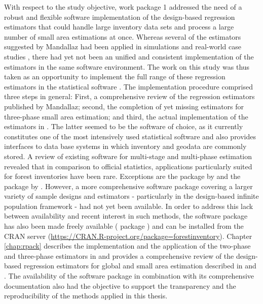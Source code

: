 With respect to the study objective, work package 1 addressed the need of a robust and flexible software implementation of the design-based regression estimators that could handle large inventory data sets and process a large number of small area estimations at once. Whereas several of the estimators suggested by Mandallaz had been applied in simulations and real-world case studies \citep{mandallaz2013a, mandallaz2013b, mandallaz2013c, massey2014a, massey2015a, massey2015b}, there had yet not been an unified and consistent implementation of the estimators in the same software environment. The work on this study was thus taken as an opportunity to implement the full range of these regression estimators in the statistical software  \citep{R}. The implementation procedure comprised three steps in general: First, a comprehensive review of the regression estimators published by Mandallaz; second, the completion of yet missing estimators for three-phase small area estimation; and third, the actual implementation of the estimators in . The latter seemed to be the software of choice, as it currently constitutes one of the most intensively used statistical software and also provides interfaces to data base systems in which inventory and geodata are commonly stored. A review of existing software for multi-stage and multi-phase estimation revealed that in comparison to official statistics, applications particularly suited for forest inventories have been rare. Exceptions are the  package  by \citet{josae2015} and the  package by \citet{cullmann2016}. However, a more comprehensive software package covering a larger variety of sample designs and estimators - particularly in the design-based infinite population framework - had not yet been available. In order to address this lack between availability and recent interest in such methods, the software package has also been made freely available ( package ) and can be installed from the CRAN server (\url{https://CRAN.R-project.org/package=forestinventory}). Chapter \ref{chap:rpack} describes the implementation and the application of the two-phase and three-phase estimators in  and provides a comprehensive review of the design-based regression estimators for global and small area estimation described in \citet{mandallaz2008, mandallaz2013a, mandallaz2013c} and \citet{mandallaz2013b}. The availability of the software package in combination with its comprehensive documentation also had the objective to support the transparency and the reproducibility of the methods applied in this thesis.


